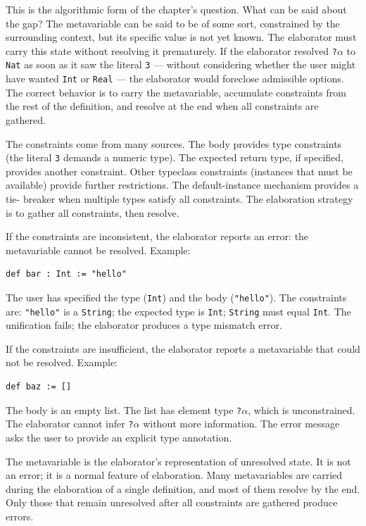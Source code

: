 This is the algorithmic form of the chapter's question. What can be
said about the gap? The metavariable can be said to be of some sort,
constrained by the surrounding context, but its specific value is not
yet known. The elaborator must carry this state without resolving it
prematurely. If the elaborator resolved \texttt{?$\alpha$} to
\texttt{Nat} as soon as it saw the literal \texttt{3} --- without
considering whether the user might have wanted \texttt{Int} or
\texttt{Real} --- the elaborator would foreclose admissible options.
The correct behavior is to carry the metavariable, accumulate
constraints from the rest of the definition, and resolve at the end
when all constraints are gathered.

The constraints come from many sources. The body provides type
constraints (the literal \texttt{3} demands a numeric type). The
expected return type, if specified, provides another constraint.
Other typeclass constraints (instances that must be available) provide
further restrictions. The default-instance mechanism provides a tie-
breaker when multiple types satisfy all constraints. The elaboration
strategy is to gather all constraints, then resolve.

If the constraints are inconsistent, the elaborator reports an error:
the metavariable cannot be resolved. Example:
\begin{verbatim}
def bar : Int := "hello"
\end{verbatim}
The user has specified the type (\texttt{Int}) and the body
(\texttt{"hello"}). The constraints are: \texttt{"hello"} is a
\texttt{String}; the expected type is \texttt{Int}; \texttt{String}
must equal \texttt{Int}. The unification fails; the elaborator
produces a type mismatch error.

If the constraints are insufficient, the elaborator reports a
metavariable that could not be resolved. Example:
\begin{verbatim}
def baz := []
\end{verbatim}
The body is an empty list. The list has element type \texttt{?$\alpha$},
which is unconstrained. The elaborator cannot infer \texttt{?$\alpha$}
without more information. The error message asks the user to provide an
explicit type annotation.

The metavariable is the elaborator's representation of unresolved
state. It is not an error; it is a normal feature of elaboration. Many
metavariables are carried during the elaboration of a single
definition, and most of them resolve by the end. Only those that remain
unresolved after all constraints are gathered produce errors.

